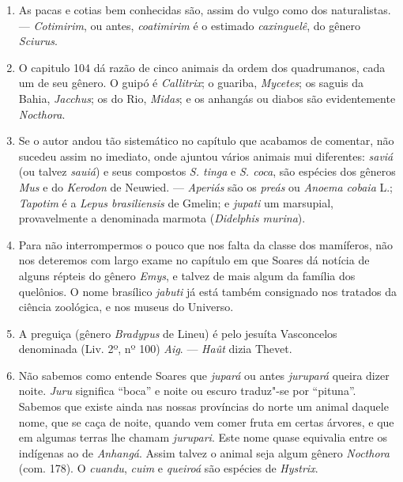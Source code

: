 \begin{enumerate}
\item As pacas e cotias bem conhecidas são, assim do vulgo como dos naturalistas. --- 
\textit{Cotimirim}, ou antes, \textit{coatimirim} é o estimado \textit{caxinguelê}, do gênero \textit{Sciurus}.

\item O capitulo 104 dá razão de cinco animais da ordem dos quadrumanos, cada um 
de seu gênero. O guipó é \textit{Callitrix}; o guariba, \textit{Mycetes}; os saguis da Bahia, \textit{Jacchus}; os 
do Rio, \textit{Midas}; e os anhangás ou diabos são evidentemente \textit{Nocthora}.

\item Se o autor andou tão sistemático no capítulo que acabamos de comentar, não 
sucedeu assim no imediato, onde ajuntou vários animais mui diferentes: \textit{saviá} (ou 
talvez \textit{sauiá}) e seus compostos \textit{S. tinga} e \textit{S. coca}, são espécies dos gêneros \textit{Mus} e do  
\textit{Kerodon} de Neuwied. --- \textit{Aperiás} são os \textit{preás} ou \textit{Anoema cobaia} L.; \textit{Tapotim} é a \textit{Lepus 
brasiliensis} de Gmelin; e \textit{jupati} um marsupial,  provavelmente  a  denominada marmota (\textit{Didelphis murina}).

\item Para não interrompermos o pouco que nos falta da classe dos mamíferos, não nos 
deteremos com largo exame no capítulo em que Soares dá notícia de alguns répteis do 
gênero \textit{Emys}, e talvez de mais algum da família dos quelônios. O nome brasílico \textit{jabuti} 
já está também consignado nos tratados da ciência zoológica, e nos museus do 
Universo.

\item A preguiça (gênero \textit{Bradypus} de Lineu) é pelo jesuíta Vasconcelos denominada 
(Liv. 2º, nº 100) \textit{Aig}. --- \textit{Haût} dizia Thevet.

\item Não sabemos como entende Soares que \textit{jupará} ou antes \textit{jurupará} queira dizer 
noite. \textit{Juru} significa ``boca''  e noite ou escuro traduz"-se por ``pituna''.  Sabemos que 
existe ainda nas nossas províncias do norte um animal daquele nome, que se caça de 
noite, quando vem comer fruta em certas árvores, e que em algumas terras lhe chamam 
\textit{jurupari}. Este nome quase equivalia entre os indígenas ao de \textit{Anhangá}. Assim talvez o 
animal seja algum gênero \textit{Nocthora} (com. 178). O \textit{cuandu}, \textit{cuim} e \textit{queiroá} são espécies 
de \textit{Hystrix}.


\end{enumerate}
